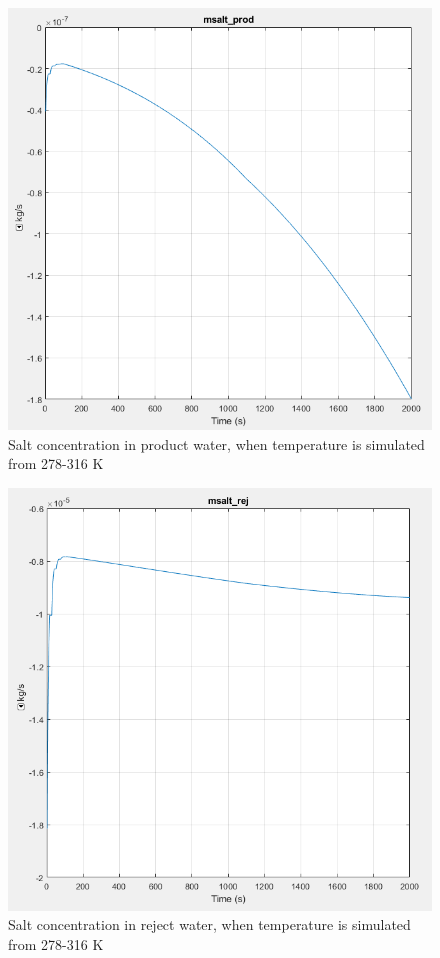 \begin{figure}[H]
\centering
  \includegraphics[width=0.6\linewidth]{msalt_prod.PNG}
  \caption{Salt concentration in product water, when temperature is simulated from 278-316 K}
  \label{fig:msaltp}
\end{figure}

\begin{figure}[H]
  \centering
  \includegraphics[width=0.6\linewidth]{msalt_rej.PNG}
  \caption{Salt concentration in reject water, when temperature is simulated from 278-316 K}
  \label{fig:msaltr}
\end{figure}
\newpage
\newpage


